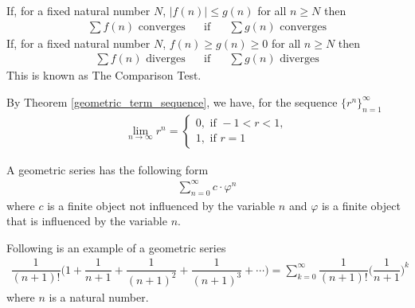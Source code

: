\begin{theorem}
If, for a fixed natural number $N$, $\lvert f(n) \rvert \leq g(n)$ for all $n \geq N$ then
\begin{align*}
    \sum f(n) \hspace{4pt} \text{converges} \hspace{20pt} \text{if} \hspace{20pt} \sum g(n) \hspace{4pt} \text{converges}
\end{align*}
If, for a fixed natural number $N$, $f(n) \geq g(n) \geq 0$ for all $n \geq N$ then
\begin{align*}
    \sum f(n) \hspace{4pt} \text{diverges} \hspace{20pt} \text{if} \hspace{20pt} \sum g(n) \hspace{4pt} \text{diverges}
\end{align*}
This is known as The Comparison Test.
\end{theorem}

\begin{recall}
By Theorem \ref{geometric_term_sequence}, we have, for the sequence $\{r^{n}\}_{n=1}^{\infty}$
\begin{align*}
    \lim_{n \longrightarrow \infty} r^{n} = \begin{cases}
    0, \hspace{4pt} \text{if} \hspace{4pt} -1 < r < 1,\\[2ex]
    1, \hspace{4pt} \text{if} \hspace{4pt} r = 1
    \end{cases}
\end{align*}
\end{recall}

\begin{definition}
A geometric series has the following form
\begin{align*}
    \sum_{n = 0}^{\infty} c \cdot \varphi^{n}
\end{align*}
where $c$ is a finite object not influenced by the variable $n$ and $\varphi$ is a finite object that is influenced by the variable $n$. 
\end{definition}

\begin{example}
Following is an example of a geometric series
\begin{align*}
    \dfrac{1}{(n+1)!} \Big( 1 + \dfrac{1}{n+1} + \dfrac{1}{(n+1)^{2}} + \dfrac{1}{(n+1)^{3}} + \cdots \Big) = \sum_{k = 0}^{\infty} \dfrac{1}{(n+1)!} \Big( \dfrac{1}{n+1} \Big)^{k}
\end{align*}
where $n$ is a natural number.
\end{example}

